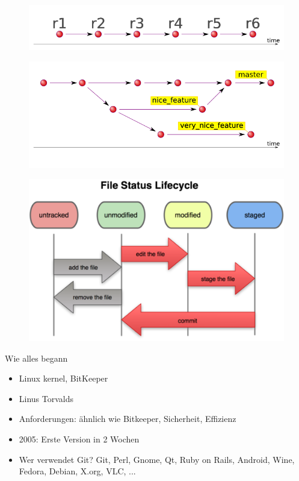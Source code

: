 \documentclass{beamer}
\begin{document}
\begin{frame}
  \begin{figure}
   \includegraphics[width=1.0\textwidth]{./images/svn-timeline.png}
  \end{figure}

  \begin{figure}
   \includegraphics[width=1.0\textwidth]{./images/git-timeline.png}
  \end{figure}
\end{frame}

\begin{frame}
 \begin{figure}
  \includegraphics[width=1.0\textwidth]{./images/file-status-lifecycle.png}
 \end{figure}

\end{frame}

\begin{frame}[<+->]{Wie alles begann}{}
  \begin{itemize}
    \item Linux kernel, BitKeeper
    \item Linus Torvalds
    \item Anforderungen: ähnlich wie Bitkeeper, Sicherheit, Effizienz
    \item 2005: Erste Version in 2 Wochen
    \item Wer verwendet Git? Git, Perl, Gnome, Qt, Ruby on Rails, Android, Wine, Fedora, Debian, X.org, VLC, ...

  \end{itemize}
\end{frame}
\end{document}
